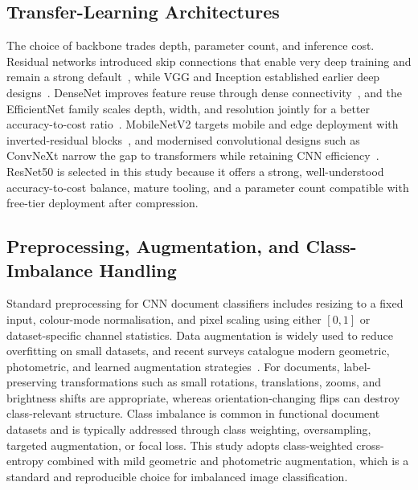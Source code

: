 \documentclass[preprint,12pt]{elsarticle}
\begin{document}
\subsection{Transfer-Learning Architectures}
The choice of backbone trades depth, parameter count, and inference cost.
Residual networks introduced skip connections that enable very deep training and
remain a strong default~\cite{he2016deep}, while VGG and Inception established
earlier deep designs~\cite{simonyan2015very,szegedy2016rethinking}.
DenseNet improves feature reuse through dense connectivity~\cite{huang2017densely},
and the EfficientNet family scales depth, width, and resolution jointly for a
better accuracy-to-cost ratio~\cite{tan2019efficientnet,tan2021efficientnetv2}.
MobileNetV2 targets mobile and edge deployment with inverted-residual
blocks~\cite{sandler2018mobilenetv2}, and modernised convolutional designs such
as ConvNeXt narrow the gap to transformers while retaining CNN
efficiency~\cite{liu2022convnet}.
ResNet50 is selected in this study because it offers a strong, well-understood
accuracy-to-cost balance, mature tooling, and a parameter count compatible with
free-tier deployment after compression.

\subsection{Preprocessing, Augmentation, and Class-Imbalance Handling}
Standard preprocessing for CNN document classifiers includes resizing to a fixed
input, colour-mode normalisation, and pixel scaling using either $[0,1]$ or
dataset-specific channel statistics.
Data augmentation is widely used to reduce overfitting on small datasets, and
recent surveys catalogue modern geometric, photometric, and learned augmentation
strategies~\cite{shorten2019survey,mumuni2022data}.
For documents, label-preserving transformations such as small rotations,
translations, zooms, and brightness shifts are appropriate, whereas
orientation-changing flips can destroy class-relevant structure.
Class imbalance is common in functional document datasets and is typically
addressed through class weighting, oversampling, targeted augmentation, or focal
loss.
This study adopts class-weighted cross-entropy combined with mild geometric and
photometric augmentation, which is a standard and reproducible choice for
imbalanced image classification.
\end{document}

